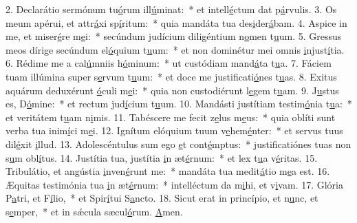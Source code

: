 2. Declarátio sermónum tu\uline{ó}rum ill\uline{ú}minat:~* et intell\uline{é}ctum dat p\uline{á}rvulis.
3. Os meum apérui, et attr\uline{á}xi sp\uline{í}ritum:~* quia mandáta tua des\uline{i}der\uline{á}bam.
4. Aspice in me, et miser\uline{é}re m\uline{e}i:~* secúndum judícium diligéntium n\uline{o}men t\uline{u}um.
5. Gressus meos dírige secúndum el\uline{ó}quium t\uline{u}um:~* et non dominétur mei omnis \uline{i}njust\uline{í}tia.
6. Rédime me a cal\uline{ú}mniis h\uline{ó}minum:~* ut custódiam mand\uline{á}ta t\uline{u}a.
7. Fáciem tuam illúmina super s\uline{e}rvum t\uline{u}um:~* et doce me justificati\uline{ó}nes t\uline{u}as.
8. Exitus aquárum deduxérunt \uline{ó}culi m\uline{e}i:~* quia non custodiérunt l\uline{e}gem t\uline{u}am.
9. J\uline{u}stus es, D\uline{ó}mine:~* et rectum jud\uline{í}cium t\uline{u}um.
10. Mandásti justítiam testim\uline{ó}nia t\uline{u}a:~* et veritátem t\uline{u}am n\uline{i}mis.
11. Tabéscere me fecit z\uline{e}lus m\uline{e}us:~* quia oblíti sunt verba tua inim\uline{í}ci m\uline{e}i.
12. Ignítum elóquium tuum v\uline{e}hem\uline{é}nter:~* et servus tuus dil\uline{é}xit \uline{i}llud.
13. Adolescéntulus sum ego \uline{e}t cont\uline{é}mptus:~* justificatiónes tuas non s\uline{u}m obl\uline{í}tus.
14. Justítia tua, justítia \uline{i}n æt\uline{é}rnum:~* et lex t\uline{u}a v\uline{é}ritas.
15. Tribulátio, et angústia \uline{i}nven\uline{é}runt me:~* mandáta tua medit\uline{á}tio m\uline{e}a est.
16. Æquitas testimónia tua \uline{i}n æt\uline{é}rnum:~* intelléctum da m\uline{i}hi, et v\uline{i}vam.
17. Glória P\uline{a}tri, et F\uline{í}lio,~* et Spir\uline{í}tui S\uline{a}ncto.
18. Sicut erat in princípio, et n\uline{u}nc, et s\uline{e}mper,~* et in sǽcula sæcul\uline{ó}rum. \uline{A}men.
